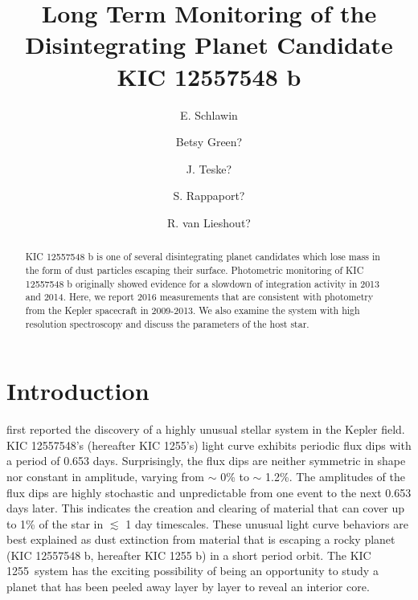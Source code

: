\documentclass[twocolumn]{aastex61}
\newcommand{\sha}{KIC 1255 b}
\newcommand{\shStar}{KIC 1255}
\begin{document}
\title{Long Term Monitoring of the Disintegrating Planet Candidate KIC 12557548 b}



\author{E. Schlawin}

\author{Betsy Green?}

\author{J. Teske?}

\author{S. Rappaport?}

\author{R. van Lieshout?}

\begin{abstract}
KIC 12557548 b is one of several disintegrating planet candidates which lose mass in the form of dust particles escaping their surface. Photometric monitoring of KIC 12557548 b originally showed evidence for a slowdown of integration activity in 2013 and 2014. Here, we report 2016 measurements that are consistent with photometry from the Kepler spacecraft in 2009-2013.
We also examine the system with high resolution spectroscopy and discuss the parameters of the host star.
\end{abstract}



\section{Introduction}
\citet{rappaport} first reported the discovery of a highly unusual stellar system in the Kepler field.
KIC 12557548's (hereafter \shStar's) light curve exhibits periodic flux dips with a period of 0.653 days.
Surprisingly, the flux dips are neither symmetric in shape nor constant in amplitude, varying from $\sim$ 0\% to $\sim$ 1.2\%.
The amplitudes of the flux dips are highly stochastic and unpredictable from one event to the next 0.653 days later.
This indicates the creation and clearing of material that can cover up to 1\% of the star in $\lesssim$ 1 day timescales.
These unusual light curve behaviors are best explained as dust extinction from material that is escaping a rocky planet (KIC 12557548 b, hereafter \sha) in a short period orbit.
The \shStar\ system has the exciting possibility of being an opportunity to study a planet that has been peeled away layer by layer to reveal an interior core.
\end{document}
